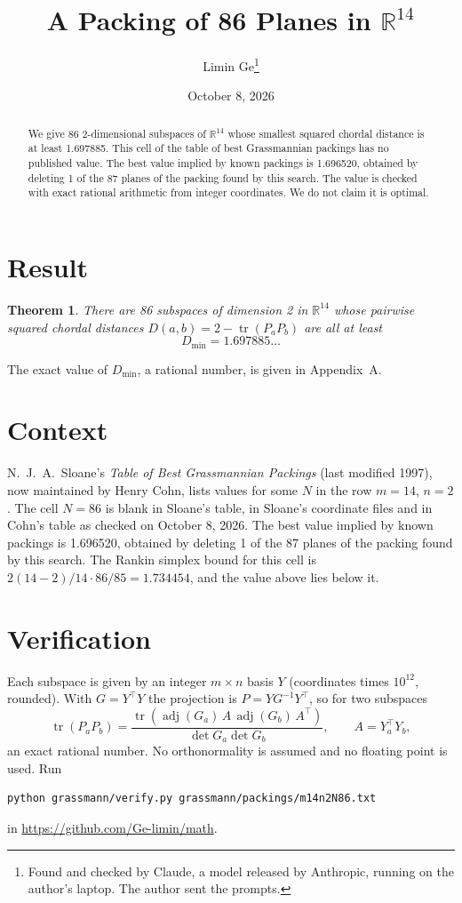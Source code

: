\documentclass[11pt,a4paper]{article}
\title{A Packing of 86 Planes in $\mathbb{R}^{14}$}
\author{Limin Ge\thanks{Found and checked by Claude, a model released by Anthropic, running on the author's laptop. The author sent the prompts.}}
\date{October 8, 2026}
\newtheorem*{theorem}{Theorem}
\begin{document}
\maketitle
\begin{abstract}
We give 86 2-dimensional subspaces of $\mathbb{R}^{14}$ whose smallest squared chordal distance is at least 1.697885. This cell of the table of best Grassmannian packings has no published value. The best value implied by known packings is 1.696520, obtained by deleting 1 of the 87 planes of the packing found by this search. The value is checked with exact rational arithmetic from integer coordinates. We do not claim it is optimal.
\end{abstract}

\section{Result}
\begin{theorem}
There are 86 subspaces of dimension 2 in $\mathbb{R}^{14}$ whose pairwise squared chordal distances $D(a,b) = 2 - \operatorname{tr}(P_aP_b)$ are all at least
\[ D_{\min} = 1.697885\ldots \]
\end{theorem}
The exact value of $D_{\min}$, a rational number, is given in Appendix~A.


\section{Context}
N.~J.~A.~Sloane's \emph{Table of Best Grassmannian Packings} (last modified 1997), now maintained by Henry Cohn, lists values for some $N$ in the row $m=14$, $n=2$. The cell $N=86$ is blank in Sloane's table, in Sloane's coordinate files and in Cohn's table as checked on October 8, 2026. The best value implied by known packings is 1.696520, obtained by deleting 1 of the 87 planes of the packing found by this search. The Rankin simplex bound for this cell is $2(14-2)/14\cdot 86/85 = 1.734454$, and the value above lies below it.


\section{Verification}
Each subspace is given by an integer $m\times n$ basis $Y$ (coordinates times $10^{12}$, rounded). With $G=Y^\top Y$ the projection is $P=YG^{-1}Y^\top$, so for two subspaces
\[ \operatorname{tr}(P_aP_b)=\frac{\operatorname{tr}(\operatorname{adj}(G_a)\,A\,\operatorname{adj}(G_b)\,A^\top)}{\det G_a\det G_b},\qquad A=Y_a^\top Y_b, \]
an exact rational number. No orthonormality is assumed and no floating point is used. Run
\begin{verbatim}
python grassmann/verify.py grassmann/packings/m14n2N86.txt
\end{verbatim}
in \url{https://github.com/Ge-limin/math}.
\end{document}
